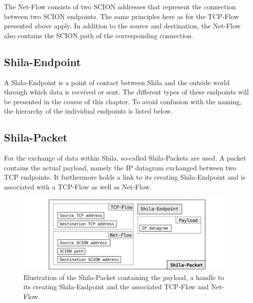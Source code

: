 The Net-Flow consists of two SCION addresses that represent the connection between two SCION endpoints. The same principles here as for the TCP-Flow presented above apply. In addition to the source and destination, the Net-Flow also contains the SCION path of the corresponding connection.

\subsection*{Shila-Endpoint}

A Shila-Endpoint is a point of contact between Shila and the outside world through which data is received or sent. The different types of these endpoints will be presented in the course of this chapter. To avoid confusion with the naming, the hierarchy of the individual endpoints is listed below.
\\

\subsection*{Shila-Packet}

For the exchange of data within Shila, so-called Shila-Packets are used. A packet contains the actual payload, namely the IP datagram exchanged between two TCP endpoints. It furthermore holds a link to its creating Shila-Endpoint and is associated with a TCP-Flow as well as Net-Flow. 

\begin{figure}[H]
	\begin{center}
		\def\svgwidth{1\textwidth}
		\includegraphics[scale=0.2]{../illustrations/implementation/ShilaPacket.pdf}   
		\caption[]{Illustration of the Shila-Packet containing the payload, a handle to its creating Shila-Endpoint and the associated TCP-Flow and Net-Flow.}
		\label{fig:IllustrationShilaPacket}
	\end{center}
\end{figure}

